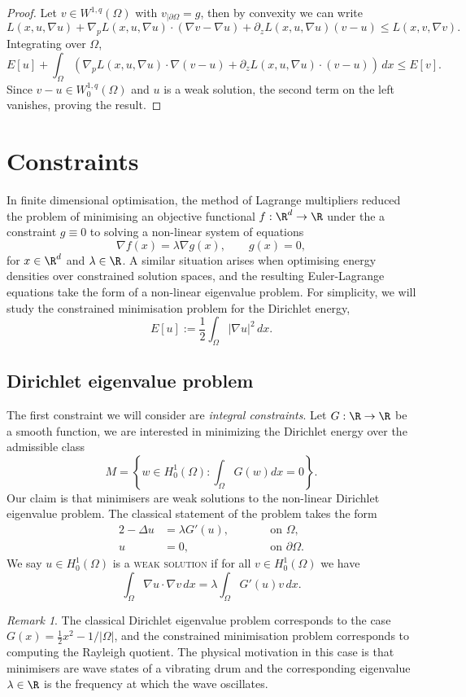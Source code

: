 \documentclass[reqno]{amsart}
\theoremstyle{definition}
\theoremstyle{remark}
\newtheorem*{remark}{Remark}
\newcounter{problem}[section]	\declaretheorem[style=thmrecbox,name=Problem, numberlike=problem]{statement}
\renewcommand{\emph}{\textsc}
\begin{document}
\begin{proof}
	Let $v \in W^{1, q} (\Omega)$ with $v_{|\partial\Omega} = g$, then by convexity we can write
		\[ L(x, u, \nabla u) + \nabla_p L(x, u, \nabla u) \cdot (\nabla v - \nabla u) + \partial_z L(x, u, \nabla u) (v - u) \leq L(x, v, \nabla v). \]
	Integrating over $\Omega$, 
		\[ E[u] +  \int_\Omega \left(\nabla_p L(x, u, \nabla u) \cdot \nabla (v - u) + \partial_z L(x, u, \nabla u) \cdot (v - u) \right) \, dx \leq E[v].\]
	Since $v - u \in W^{1, q}_0 (\Omega)$ and $u$ is a weak solution, the second term on the left vanishes, proving the result. 		
\end{proof}

\section{Constraints}

In finite dimensional optimisation, the method of Lagrange multipliers reduced the problem of minimising an objective functional $f :\R^d \to \R$ under the a constraint $g \equiv 0$ to solving a non-linear system of equations 
	\[ \nabla f(x) = \lambda \nabla g(x), \qquad g(x) = 0, \]
for $x \in \R^d$ and $\lambda \in \R$. A similar situation arises when optimising energy densities over constrained solution spaces, and the resulting Euler-Lagrange equations take the form of a non-linear eigenvalue problem. For simplicity, we will study the constrained minimisation problem for the Dirichlet energy,
	\[ E[u] := \frac12 \int_\Omega |\nabla u|^2 \, dx. \]

\subsection{Dirichlet eigenvalue problem}

The first constraint we will consider are \textit{integral constraints}. Let $G: \R \to \R$ be a smooth function, we are interested in minimizing the Dirichlet energy over the admissible class
	\[ M = \left\{ w \in H^1_0(\Omega) : \int_\Omega G (w) dx = 0 \right\}.  \]
Our claim is that minimisers are weak solutions to the non-linear Dirichlet eigenvalue problem. The classical statement of the problem takes the form 	
	\begin{alignat*}{2}
				-\Delta u &= \lambda G'(u), 	& \qquad &\text{on } \Omega, \\
				u &= 0, 	&	&\text{on } \partial \Omega.
	\end{alignat*}
	We say $u \in H^1_0 (\Omega)$ is a \emph{weak solution} if for all $v \in H_0^1 (\Omega)$ we have
		\[ \int_\Omega \nabla u \cdot \nabla v \, dx = \lambda \int_\Omega G'(u) v \, dx .\]
\begin{remark}
	The classical Dirichlet eigenvalue problem corresponds to the case $G(x) = \tfrac12 x^2 - 1/|\Omega|$, and the constrained minimisation problem corresponds to computing the Rayleigh quotient. The physical motivation in this case is that minimisers are wave states of a vibrating drum and the corresponding eigenvalue $\lambda \in \R$ is the frequency at which the wave oscillates. 
\end{remark}
\end{document}
